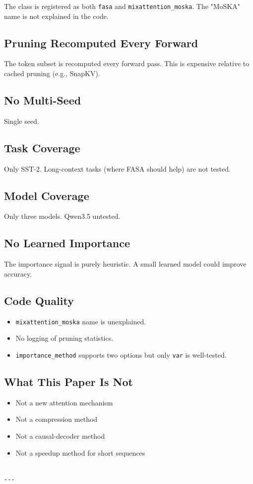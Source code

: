 The class is registered as both \texttt{fasa} and \texttt{mixattention\_moska}. The 
"MoSKA" name is not explained in the code.

\subsection{Pruning Recomputed Every Forward}

The token subset is recomputed every forward pass. This is expensive 
relative to cached pruning (e.g., SnapKV).

\subsection{No Multi-Seed}

Single seed.

\subsection{Task Coverage}

Only SST-2. Long-context tasks (where FASA should help) are not tested.

\subsection{Model Coverage}

Only three models. Qwen3.5 untested.

\subsection{No Learned Importance}

The importance signal is purely heuristic. A small learned model could 
improve accuracy.

\subsection{Code Quality}

\begin{itemize}
\item \texttt{mixattention\_moska} name is unexplained.
\item No logging of pruning statistics.
\item \texttt{importance\_method} supports two options but only \texttt{var} is well-tested.

\end{itemize}
\subsection{What This Paper Is Not}

\begin{itemize}
\item Not a new attention mechanism
\item Not a compression method
\item Not a causal-decoder method
\item Not a speedup method for short sequences
\end{itemize}
\begin{lstlisting}

---
\end{lstlisting}